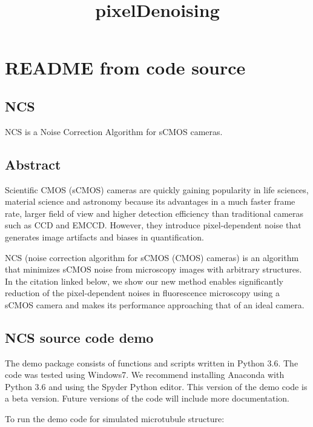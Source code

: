 \documentclass[11pt]{article}
\title{pixelDenoising}
\begin{document}
    
    
    \maketitle
    
    

    
    \section{README from code source}\label{readme-from-code-source}

\subsection{NCS}\label{ncs}

NCS is a Noise Correction Algorithm for sCMOS cameras.

\subsection{Abstract}\label{abstract}

Scientific CMOS (sCMOS) cameras are quickly gaining popularity in life
sciences, material science and astronomy because its advantages in a
much faster frame rate, larger field of view and higher detection
efficiency than traditional cameras such as CCD and EMCCD. However, they
introduce pixel-dependent noise that generates image artifacts and
biases in quantification.

NCS (noise correction algorithm for sCMOS (CMOS) cameras) is an
algorithm that minimizes sCMOS noise from microscopy images with
arbitrary structures. In the citation linked below, we show our new
method enables significantly reduction of the pixel-dependent noises in
fluorescence microscopy using a sCMOS camera and makes its performance
approaching that of an ideal camera.

\subsection{NCS source code demo}\label{ncs-source-code-demo}

The demo package consists of functions and scripts written in Python
3.6. The code was tested using Windows7. We recommend installing
Anaconda with Python 3.6 and using the Spyder Python editor. This
version of the demo code is a beta version. Future versions of the code
will include more documentation.

To run the demo code for simulated microtubule structure:
\end{document}
